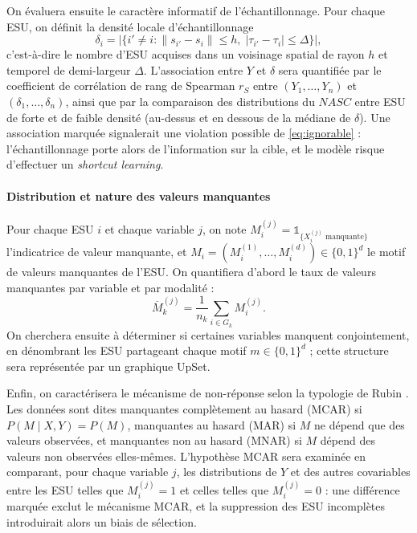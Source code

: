 			On évaluera ensuite le caractère informatif de l'échantillonnage. Pour chaque ESU, on définit la densité locale d'échantillonnage
			\begin{equation}\label{eq:densite}
				\delta_i = \bigl|\{ i' \ne i : \|s_{i'} - s_i\| \le h,\; |\tau_{i'} - \tau_i| \le \Delta \}\bigr|,
			\end{equation}
			c'est-à-dire le nombre d'ESU acquises dans un voisinage spatial de rayon $h$ et temporel de demi-largeur $\Delta$. L'association entre $Y$ et $\delta$ sera quantifiée par le coefficient de corrélation de rang de Spearman $r_S$ entre $(Y_1, \dots, Y_n)$ et $(\delta_1, \dots, \delta_n)$, ainsi que par la comparaison des distributions du $NASC$ entre ESU de forte et de faible densité (au-dessus et en dessous de la médiane de $\delta$). Une association marquée signalerait une violation possible de \eqref{eq:ignorable} : l'échantillonnage porte alors de l'information sur la cible, et le modèle risque d'effectuer un \textit{shortcut learning}.
		
		\paragraph{Distribution et nature des valeurs manquantes}
			Pour chaque ESU $i$ et chaque variable $j$, on note $M_i^{(j)} = \mathds{1}_{\{X_i^{(j)} \text{ manquante}\}}$ l'indicatrice de valeur manquante, et $M_i = (M_i^{(1)}, \dots, M_i^{(d)}) \in \{0, 1\}^d$ le motif de valeurs manquantes de l'ESU. On quantifiera d'abord le taux de valeurs manquantes par variable et par modalité :
			\begin{equation}
				\overline{M}_k^{(j)} = \frac{1}{n_k} \sum_{i \in G_k} M_i^{(j)}.
			\end{equation}
			On cherchera ensuite à déterminer si certaines variables manquent conjointement, en dénombrant les ESU partageant chaque motif $m \in \{0, 1\}^d$ ; cette structure sera représentée par un graphique UpSet.
			
			Enfin, on caractérisera le mécanisme de non-réponse selon la typologie de Rubin \cite{rubin1976}. Les données sont dites manquantes complètement au hasard (MCAR) si $P(M \mid X, Y) = P(M)$, manquantes au hasard (MAR) si $M$ ne dépend que des valeurs observées, et manquantes non au hasard (MNAR) si $M$ dépend des valeurs non observées elles-mêmes. L'hypothèse MCAR sera examinée en comparant, pour chaque variable $j$, les distributions de $Y$ et des autres covariables entre les ESU telles que $M_i^{(j)} = 1$ et celles telles que $M_i^{(j)} = 0$ : une différence marquée exclut le mécanisme MCAR, et la suppression des ESU incomplètes introduirait alors un biais de sélection.
	

